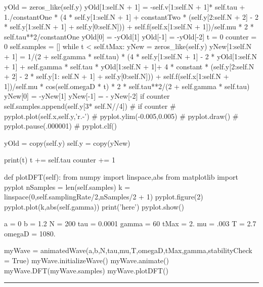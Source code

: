 \begin{codeexample}
\begin{VerbatimOut}{\listingFile}
        yOld = zeros_like(self.y)
        yOld[1:self.N + 1] = -self.v[1:self.N + 1]* self.tau + 1./constantOne * (4 * self.y[1:self.N + 1] + constantTwo * (self.y[2:self.N + 2] - 2 * self.y[1:self.N + 1] + self.y[0:self.N])) + self.f(self.x[1:self.N + 1])/self.mu  * 2 * self.tau**2/constantOne
        yOld[0] = -yOld[1]
        yOld[-1] = -yOld[-2]
        t = 0
        counter = 0
        self.samples = []
        while t < self.tMax:
            yNew = zeros_like(self.y)
            yNew[1:self.N + 1] = 1/(2 + self.gamma * self.tau) * (4 * self.y[1:self.N + 1] - 2 * yOld[1:self.N + 1] + self.gamma * self.tau * yOld[1:self.N + 1]+ 4 * constant * (self.y[2:self.N + 2] - 2 * self.y[1: self.N + 1] + self.y[0:self.N])) + self.f(self.x[1:self.N + 1])/self.mu * cos(self.omegaD * t) * 2 * self.tau**2/(2 + self.gamma * self.tau)
            yNew[0] =  -yNew[1]
            yNew[-1] = - yNew[-2]
            if counter %
                self.samples.append(self.y[3* self.N//4])
#            if counter %
#                pyplot.plot(self.x,self.y,'r.-')
#                pyplot.ylim(-0.005,0.005)
#                pyplot.draw()
#                pyplot.pause(.000001)
#                pyplot.clf()


            yOld = copy(self.y)
            self.y = copy(yNew)

            print(t)
            t += self.tau
            counter += 1

    def plotDFT(self):
        from numpy import linspace,abs
        from matplotlib import pyplot
        nSamples = len(self.samples)
        k = linspace(0,self.samplingRate/2,nSamples/2 + 1)
        pyplot.figure(2)
        pyplot.plot(k,abs(self.gamma))
        print('here')
        pyplot.show()
            
            
a = 0
b = 1.2
N = 200
tau = 0.0001
gamma = 60
tMax = 2.
mu = .003
T = 2.7
omegaD = 1080.


myWave = animatedWave(a,b,N,tau,mu,T,omegaD,tMax,gamma,stabilityCheck = True)
myWave.initializeWave()
myWave.animate()
myWave.DFT(myWave.samples)
myWave.plotDFT()

\end{VerbatimOut}
\end{codeexample}
\else
\noindent\rule{5 in}{0.01 in}
\fi



